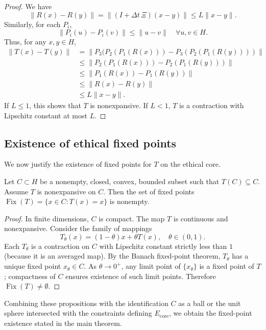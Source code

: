 \documentclass[11pt]{article}
\begin{document}
\begin{proof}
We have
\[
  \|R(x)-R(y)\| = \|(I+\Delta t\,\Xi)(x-y)\| \le L\|x-y\|.
\]
Similarly, for each $P_i$,
\[
  \|P_i(u)-P_i(v)\| \le \|u-v\|\quad\forall u,v\in H.
\]
Thus, for any $x,y\in H$,
\begin{align*}
  \|T(x)-T(y)\|
  &= \|P_3(P_2(P_1(R(x))) - P_3(P_2(P_1(R(y))))\| \\
  &\le \|P_2(P_1(R(x))) - P_2(P_1(R(y)))\| \\
  &\le \|P_1(R(x)) - P_1(R(y))\| \\
  &\le \|R(x) - R(y)\| \\
  &\le L\|x-y\|.
\end{align*}
If $L\le 1$, this shows that $T$ is nonexpansive. If $L<1$, $T$ is a contraction with Lipschitz constant at most $L$.
\end{proof}

\subsection{Existence of ethical fixed points}

We now justify the existence of fixed points for $T$ on the ethical core.

\begin{proposition}
Let $C\subset H$ be a nonempty, closed, convex, bounded subset such that $T(C)\subseteq C$.
Assume $T$ is nonexpansive on $C$. Then the set of fixed points
$\operatorname{Fix}(T) = \{x\in C : T(x)=x\}$ is nonempty.
\end{proposition}

\begin{proof}
In finite dimensions, $C$ is compact. The map $T$ is continuous and nonexpansive. Consider the family of mappings
\[
  T_\theta(x) = (1-\theta)x + \theta T(x),\quad \theta\in(0,1).
\]
Each $T_\theta$ is a contraction on $C$ with Lipschitz constant strictly less than $1$ (because it is an averaged map). By the Banach fixed-point theorem, $T_\theta$ has a unique fixed point $x_\theta\in C$. As $\theta\to 0^+$, any limit point of $\{x_\theta\}$ is a fixed point of $T$; compactness of $C$ ensures existence of such limit points. Therefore $\operatorname{Fix}(T)\ne\emptyset$.
\end{proof}

Combining these propositions with the identification $C$ as a ball or the unit sphere intersected with the constraints defining $E_{\mathrm{core}}$, we obtain the fixed-point existence stated in the main theorem.
\end{document}
